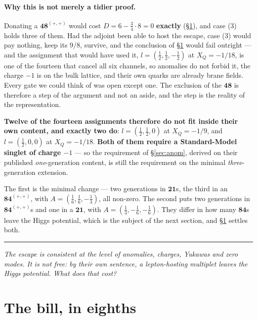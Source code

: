 \documentclass[11pt,a4paper]{article}
\newcommand{\rep}[1]{\mathbf{#1}}
\newcommand{\bridge}[1]{\par\medskip\noindent
  \textcolor{hdrblue!45}{\rule{2.2cm}{0.6pt}}\;\;\parbox[t]{0.84\textwidth}{\small\itshape
  \textcolor{hdrblue!85}{#1}}\par\medskip}
\newenvironment{keyeq}
  {\begin{center}\setlength{\fboxsep}{9pt}\setlength{\fboxrule}{0.8pt}%
   \begin{lrbox}{\keyeqbox}\begin{minipage}{0.88\textwidth}}
  {\end{minipage}\end{lrbox}%
   \fcolorbox{hdrblue!55}{hdrblue!6}{\usebox{\keyeqbox}}\end{center}}
\begin{document}
\paragraph{Why this is not merely a tidier proof.} Donating a $\rep{48}^{(+,+)}$ would cost
$D=6-\tfrac34\cdot8=0$ \textbf{exactly} (\S\ref{sec:vacuum}), and case (3) holds three of them. Had
the adjoint been able to host the escape, case (3) would pay nothing, keep its $9/8$, survive, and
the conclusion of \S\ref{sec:vacuum} would fail outright --- and the assignment that would have used
it, $l=(\tfrac12,\tfrac12,-\tfrac12)$ at $X_Q=-1/18$, is one of the fourteen that cancel all six
channels, so anomalies do not forbid it, the charge $-1$ is on the bulk lattice, and their own quarks
are already brane fields. Every gate we could think of was open except one. The exclusion of the
$\rep{48}$ is therefore a step of the argument and not an aside, and the step is the reality of the
representation.

\begin{keyeq}
\textbf{Twelve of the fourteen assignments therefore do not fit inside their own content, and
exactly two do}: $l=(\tfrac12,\tfrac12,0)$ at $X_Q=-1/9$, and $l=(\tfrac12,0,0)$ at $X_Q=-1/18$.
\textbf{Both of them require a Standard-Model singlet of charge $-1$} --- so the requirement of
\S\ref{sec:anom}, derived on their published \emph{one}-generation content, is still the requirement
on the minimal \emph{three}-generation extension.
\end{keyeq}

The first is the minimal change --- two generations in $\rep{21}$s, the third in an
$\rep{84}^{(+,+)}$, with $A=(\tfrac16,\tfrac16,-\tfrac13)$, all non-zero. The second puts two
generations in $\rep{84}^{(+,+)}$s and one in a $\rep{21}$, with $A=(\tfrac13,-\tfrac16,-\tfrac16)$.
They differ in how many $\rep{84}$s leave the Higgs potential, which is the subject of the next
section, and \S\ref{sec:vacuum} settles both.

\bridge{The escape is consistent at the level of anomalies, charges, Yukawas and zero modes. It is
not free: by their own sentence, a lepton-hosting multiplet leaves the Higgs potential. What does
that cost?}

\section{The bill, in eighths}\label{sec:vacuum}
\end{document}
